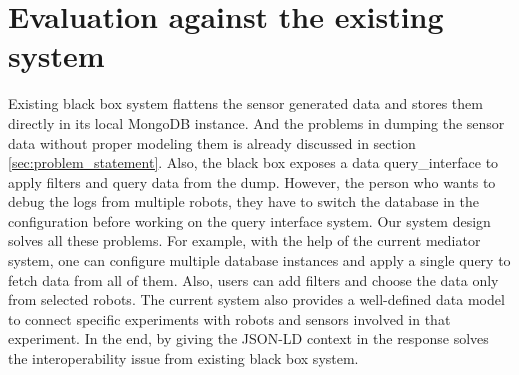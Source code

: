 \section{Evaluation against the existing system}
Existing black box system flattens the sensor generated data and stores them directly in its local MongoDB instance. And the problems in dumping the sensor data without proper modeling them is already discussed in section \ref{sec:problem_statement}. Also, the black box exposes a data query\_interface to apply filters and query data from the dump. However, the person who wants to debug the logs from multiple robots, they have to switch the database in the configuration before working on the query interface system. Our system design solves all these problems. For example, with the help of the current mediator system, one can configure multiple database instances and apply a single query to fetch data from all of them. Also, users can add filters and choose the data only from selected robots. The current system also provides a well-defined data model to connect specific experiments with robots and sensors involved in that experiment. In the end, by giving the JSON-LD context in the response solves the interoperability issue from existing black box system.

